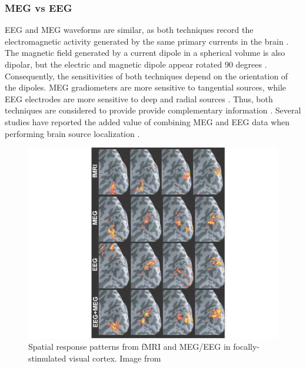           \subsubsection*{MEG vs EEG}

EEG and MEG waveforms are similar, as both techniques record the electromagnetic activity generated by the same primary currents in the brain \citep{Niedermeyer2010}. The magnetic field generated by a current dipole in a spherical volume is also dipolar, but the electric and magnetic dipole appear rotated 90 degrees \citep{Hari2004}. Consequently, the sensitivities of both techniques depend on the orientation of the dipoles. MEG gradiometers are more sensitive to tangential sources, while EEG electrodes are more sensitive to deep and radial sources \citep{Hari2004}. Thus, both techniques are considered to provide provide complementary information \citep{Sharon2007}. Several studies have reported the added value of combining MEG and EEG data when performing brain source localization \citep{Aydin2015,Sharon2007}. 


\begin{figure}[ht]
\centering
\includegraphics[width=1\textwidth]{Images/eegmegfmri.jpg}
\caption{Spatial response patterns from fMRI and MEG/EEG in focally-stimulated visual cortex. Image from \citet{Sharon2007}}
\label{fig:eegmegfmri}
\end{figure}      

